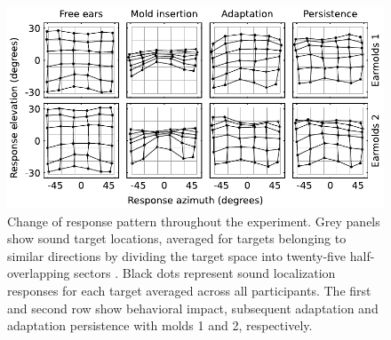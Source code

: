 \begin{figure}[ht]
	\includegraphics[width=14cm, center]{../Results/figures/fig7/fig7}
	\caption{Change of response pattern throughout the experiment. Grey panels show sound target locations, averaged for targets belonging to similar directions by dividing the target space into twenty-five half-overlapping sectors \citep{hofman_relearning_1998}. Black dots represent sound localization responses for each target averaged across all participants. The first and second row show behavioral impact, subsequent adaptation and adaptation persistence with molds 1 and 2, respectively.}
        \label{fig:response_evo}
\end{figure}

